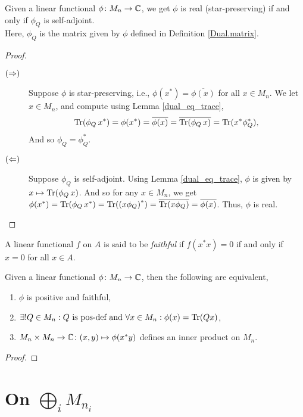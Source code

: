   \begin{proposition}\label{Dual.isReal_iff}\leanok
   Given a linear functional $\phi\colon{M_n}\to\mathbb{C}$, we get $\phi$ is real (star-preserving) if and only if $\phi_Q$ is self-adjoint.\\
   Here, $\phi_Q$ is the matrix given by $\phi$ defined in Definition \ref{Dual.matrix}.
  \end{proposition}
  \begin{proof}\leanok {\ }
   \begin{description}
    \item[$(\Rightarrow)$]
     Suppose $\phi$ is star-preserving, i.e., $\phi(x^*)=\overline{\phi(x)}$ for all $x\in{M_n}$.
     We let $x\in{M_n}$, and compute using Lemma \ref{dual_eq_trace},
     \[\operatorname{Tr}(\phi_Q\, x^*)=\phi(x^*)=\overline{\phi(x)}=\overline{\operatorname{Tr}(\phi_Q\, x)}=\operatorname{Tr}(x^*\phi_Q^*),\]
     And so $\phi_Q=\phi_Q^*$.
    \item[$(\Leftarrow)$]
     Suppose $\phi_Q$ is self-adjoint. Using Lemma \ref{dual_eq_trace}, $\phi$ is given by $x\mapsto\operatorname{Tr}(\phi_Q\, x)$.
     And so for any $x\in{M_n}$, we get $\phi(x^*)=\operatorname{Tr}(\phi_Q\, x^*)=\operatorname{Tr}({(x\phi_Q)}^*)=\overline{\operatorname{Tr}(x\phi_Q)}=\overline{\phi(x)}$.
     Thus, $\phi$ is real.
   \end{description}
  \end{proof}

  \begin{definition}\label{Dual.IsFaithful}\leanok
   A linear functional $f$ on $A$ is said to be \textit{faithful} if $f(x^*x)=0$ if and only if $x=0$ for all $x\in A$.
  \end{definition}

  \begin{theorem}\label{Dual.isFaithfulPosMap_tfae}
   Given a linear functional $\phi\colon{M_n}\to\mathbb{C}$, then the following are equivalent,
   \begin{enumerate}[label=(\roman*)]
    \item $\phi$ is positive and faithful,
    \item $\exists!Q\in{M_n}:Q\text{ is pos-def and }\forall{x}\in{M_n}:\phi(x)=\operatorname{Tr}(Qx)$,
    \item $M_n\times{M_n}\to\mathbb{C}\colon(x,y)\mapsto\phi(x^*y)$ defines an inner product on $M_n$.
   \end{enumerate}
  \end{theorem}
  \begin{proof}
  \end{proof}

 \section{On $\bigoplus_i M_{n_i}$}
  
 


 